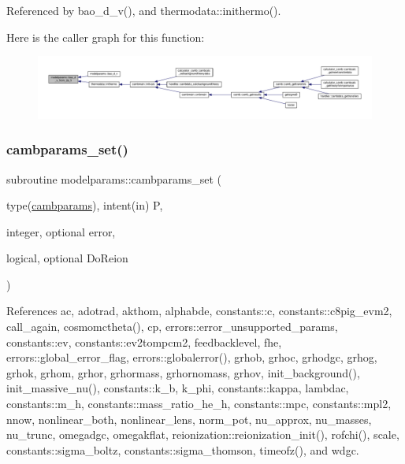 Referenced by bao\+\_\+d\+\_\+v(), and thermodata\+::inithermo().

Here is the caller graph for this function\+:
\nopagebreak
\begin{figure}[H]
\begin{center}
\leavevmode
\includegraphics[width=350pt]{namespacemodelparams_a3a1026b2054f510f0c0dd9ee5c95e1b9_icgraph}
\end{center}
\end{figure}
\mbox{\label{namespacemodelparams_a13f805ae3c4213f4c9204bf8d8f17350}} 
\subsubsection{\texorpdfstring{cambparams\+\_\+set()}{cambparams\_set()}}
{\footnotesize\ttfamily subroutine modelparams\+::cambparams\+\_\+set (\begin{DoxyParamCaption}\item[{type(\mbox{\hyperlink{structmodelparams_1_1cambparams}{cambparams}}), intent(in)}]{P,  }\item[{integer, optional}]{error,  }\item[{logical, optional}]{Do\+Reion }\end{DoxyParamCaption})}



References ac, adotrad, akthom, alphabde, constants\+::c, constants\+::c8pig\+\_\+evm2, call\+\_\+again, cosmomctheta(), cp, errors\+::error\+\_\+unsupported\+\_\+params, constants\+::ev, constants\+::ev2tompcm2, feedbacklevel, fhe, errors\+::global\+\_\+error\+\_\+flag, errors\+::globalerror(), grhob, grhoc, grhodgc, grhog, grhok, grhom, grhor, grhormass, grhornomass, grhov, init\+\_\+background(), init\+\_\+massive\+\_\+nu(), constants\+::k\+\_\+b, k\+\_\+phi, constants\+::kappa, lambdac, constants\+::m\+\_\+h, constants\+::mass\+\_\+ratio\+\_\+he\+\_\+h, constants\+::mpc, constants\+::mpl2, nnow, nonlinear\+\_\+both, nonlinear\+\_\+lens, norm\+\_\+pot, nu\+\_\+approx, nu\+\_\+masses, nu\+\_\+trunc, omegadgc, omegakflat, reionization\+::reionization\+\_\+init(), rofchi(), scale, constants\+::sigma\+\_\+boltz, constants\+::sigma\+\_\+thomson, timeofz(), and wdgc.



